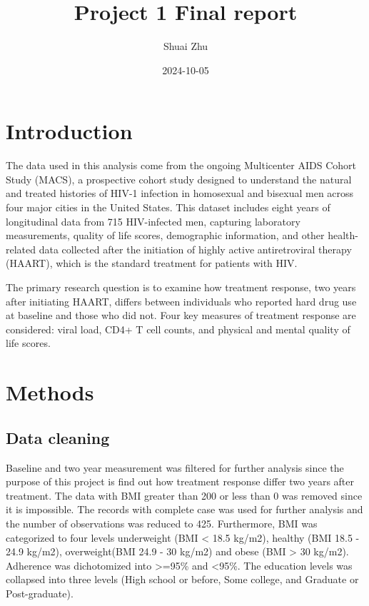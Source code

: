 \documentclass[
  12pt,
]{article}
\title{Project 1 Final report}
\author{Shuai Zhu}
\date{2024-10-05}
\begin{document}
\maketitle

\hypertarget{introduction}{%
\section{Introduction}\label{introduction}}

The data used in this analysis come from the ongoing Multicenter AIDS
Cohort Study (MACS), a prospective cohort study designed to understand
the natural and treated histories of HIV-1 infection in homosexual and
bisexual men across four major cities in the United States. This dataset
includes eight years of longitudinal data from 715 HIV-infected men,
capturing laboratory measurements, quality of life scores, demographic
information, and other health-related data collected after the
initiation of highly active antiretroviral therapy (HAART), which is the
standard treatment for patients with HIV.

The primary research question is to examine how treatment response, two
years after initiating HAART, differs between individuals who reported
hard drug use at baseline and those who did not. Four key measures of
treatment response are considered: viral load, CD4+ T cell counts, and
physical and mental quality of life scores.

\hypertarget{methods}{%
\section{Methods}\label{methods}}

\hypertarget{data-cleaning}{%
\subsection{Data cleaning}\label{data-cleaning}}

Baseline and two year measurement was filtered for further analysis
since the purpose of this project is find out how treatment response
differ two years after treatment. The data with BMI greater than 200 or
less than 0 was removed since it is impossible. The records with
complete case was used for further analysis and the number of
observations was reduced to 425. Furthermore, BMI was categorized to
four levels underweight (BMI \textless{} 18.5 kg/m2), healthy (BMI 18.5
- 24.9 kg/m2), overweight(BMI 24.9 - 30 kg/m2) and obese (BMI
\textgreater{} 30 kg/m2). Adherence was dichotomized into
\textgreater=95\% and \textless95\%. The education levels was collapsed
into three levels (High school or before, Some college, and Graduate or
Post-graduate).
\end{document}
